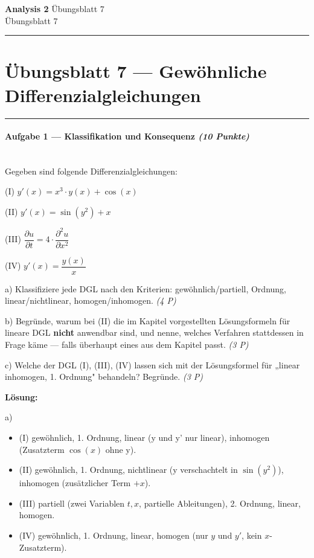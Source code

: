 \documentclass[11pt, a4paper]{article}
\providecommand{\nichttitle}{Übungsblatt}
\providecommand{\nichtsubtitle}{}
\renewcommand{\nichttitle}{Analysis 2}
\renewcommand{\nichtsubtitle}{Übungsblatt 7}
\begin{document}
\begin{center}
{\Large\bfseries\color{accent}\nichttitle}
\ifx\nichtsubtitle\empty\else
  \\[2pt]{\normalsize\color{accent!80!black}\nichtsubtitle}
\fi
\\[2pt]
\color{accent}\rule{0.4\linewidth}{0.8pt}\color{black}
\end{center}
\vspace{4pt}


\section{Übungsblatt 7 — Gewöhnliche Differenzialgleichungen}


\noindent\textcolor{rulegray}{\rule{\linewidth}{0.4pt}}


\paragraph{Aufgabe 1 — Klassifikation und Konsequenz \textit{(10 Punkte)}}\mbox{}\\[2pt]

Gegeben sind folgende Differenzialgleichungen:


(I) $y'(x) = x^3 \cdot y(x) + \cos(x)$

(II) $y'(x) = \sin(y^2) + x$

(III) $\dfrac{\partial u}{\partial t} = 4 \cdot \dfrac{\partial^2 u}{\partial x^2}$

(IV) $y'(x) = \dfrac{y(x)}{x}$


a) Klassifiziere jede DGL nach den Kriterien: gewöhnlich/partiell, Ordnung, linear/nichtlinear, homogen/inhomogen. \textit{(4 P)}

b) Begründe, warum bei (II) die im Kapitel vorgestellten Lösungsformeln für lineare DGL \textbf{nicht} anwendbar sind, und nenne, welches Verfahren stattdessen in Frage käme — falls überhaupt eines aus dem Kapitel passt. \textit{(3 P)}

c) Welche der DGL (I), (III), (IV) lassen sich mit der Lösungsformel für „linear inhomogen, 1. Ordnung" behandeln? Begründe. \textit{(3 P)}


\textbf{Lösung:}


a)

\begin{itemize}
  \item (I) gewöhnlich, 1. Ordnung, linear (y und y' nur linear), inhomogen (Zusatzterm $\cos(x)$ ohne y).
  \item (II) gewöhnlich, 1. Ordnung, nichtlinear (y verschachtelt in $\sin(y^2)$), inhomogen (zusätzlicher Term $+x$).
  \item (III) partiell (zwei Variablen $t,x$, partielle Ableitungen), 2. Ordnung, linear, homogen.
  \item (IV) gewöhnlich, 1. Ordnung, linear, homogen (nur $y$ und $y'$, kein $x$-Zusatzterm).
\end{itemize}
\end{document}
